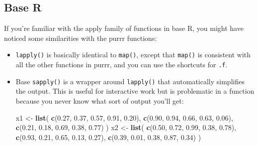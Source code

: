 \documentclass[]{book}
\newenvironment{Shaded}{\begin{snugshade}}{\end{snugshade}}
\newcommand{\KeywordTok}[1]{\textcolor[rgb]{0.13,0.29,0.53}{\textbf{{#1}}}}
\newcommand{\FloatTok}[1]{\textcolor[rgb]{0.00,0.00,0.81}{{#1}}}
\newcommand{\StringTok}[1]{\textcolor[rgb]{0.31,0.60,0.02}{{#1}}}
\newcommand{\NormalTok}[1]{{#1}}
\begin{document}
\subsection{Base R}\label{base-r}

If you're familiar with the apply family of functions in base R, you
might have noticed some similarities with the purrr functions:

\begin{itemize}
\item
  \texttt{lapply()} is basically identical to \texttt{map()}, except
  that \texttt{map()} is consistent with all the other functions in
  purrr, and you can use the shortcuts for \texttt{.f}.
\item
  Base \texttt{sapply()} is a wrapper around \texttt{lapply()} that
  automatically simplifies the output. This is useful for interactive
  work but is problematic in a function because you never know what sort
  of output you'll get:

\begin{Shaded}
\begin{Highlighting}[]
\NormalTok{x1 <-}\StringTok{ }\KeywordTok{list}\NormalTok{(}
  \KeywordTok{c}\NormalTok{(}\FloatTok{0.27}\NormalTok{, }\FloatTok{0.37}\NormalTok{, }\FloatTok{0.57}\NormalTok{, }\FloatTok{0.91}\NormalTok{, }\FloatTok{0.20}\NormalTok{),}
  \KeywordTok{c}\NormalTok{(}\FloatTok{0.90}\NormalTok{, }\FloatTok{0.94}\NormalTok{, }\FloatTok{0.66}\NormalTok{, }\FloatTok{0.63}\NormalTok{, }\FloatTok{0.06}\NormalTok{), }
  \KeywordTok{c}\NormalTok{(}\FloatTok{0.21}\NormalTok{, }\FloatTok{0.18}\NormalTok{, }\FloatTok{0.69}\NormalTok{, }\FloatTok{0.38}\NormalTok{, }\FloatTok{0.77}\NormalTok{)}
\NormalTok{)}
\NormalTok{x2 <-}\StringTok{ }\KeywordTok{list}\NormalTok{(}
  \KeywordTok{c}\NormalTok{(}\FloatTok{0.50}\NormalTok{, }\FloatTok{0.72}\NormalTok{, }\FloatTok{0.99}\NormalTok{, }\FloatTok{0.38}\NormalTok{, }\FloatTok{0.78}\NormalTok{), }
  \KeywordTok{c}\NormalTok{(}\FloatTok{0.93}\NormalTok{, }\FloatTok{0.21}\NormalTok{, }\FloatTok{0.65}\NormalTok{, }\FloatTok{0.13}\NormalTok{, }\FloatTok{0.27}\NormalTok{), }
  \KeywordTok{c}\NormalTok{(}\FloatTok{0.39}\NormalTok{, }\FloatTok{0.01}\NormalTok{, }\FloatTok{0.38}\NormalTok{, }\FloatTok{0.87}\NormalTok{, }\FloatTok{0.34}\NormalTok{)}
\NormalTok{)}


\end{Highlighting}
\end{Shaded}
\end{itemize}
\end{document}
